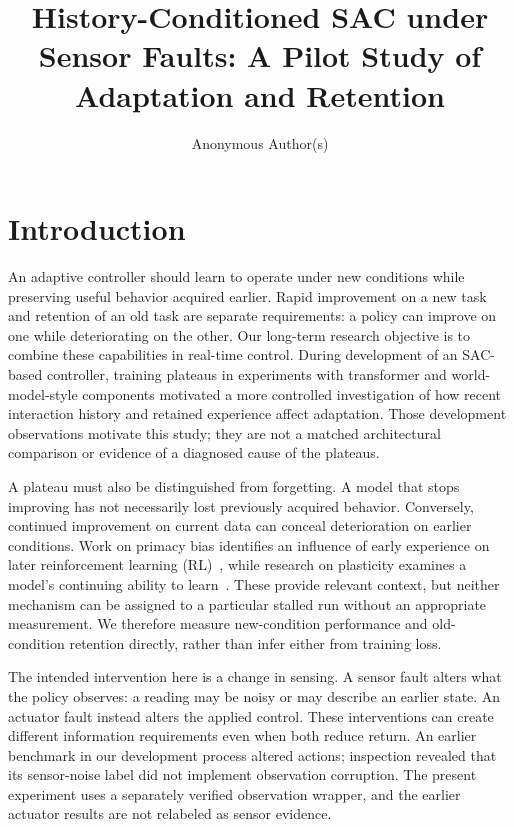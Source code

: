 \documentclass[runningheads]{llncs}
\begin{document}
\title{History-Conditioned SAC under Sensor Faults: A Pilot Study of Adaptation and Retention}
\author{Anonymous Author(s)}
\institute{}
\maketitle

\begin{abstract}

\end{abstract}

\section{Introduction}
An adaptive controller should learn to operate under new conditions while preserving useful behavior acquired earlier. Rapid improvement on a new task and retention of an old task are separate requirements: a policy can improve on one while deteriorating on the other. Our long-term research objective is to combine these capabilities in real-time control. During development of an SAC-based controller, training plateaus in experiments with transformer and world-model-style components motivated a more controlled investigation of how recent interaction history and retained experience affect adaptation. Those development observations motivate this study; they are not a matched architectural comparison or evidence of a diagnosed cause of the plateaus.

A plateau must also be distinguished from forgetting. A model that stops improving has not necessarily lost previously acquired behavior. Conversely, continued improvement on current data can conceal deterioration on earlier conditions. Work on primacy bias identifies an influence of early experience on later reinforcement learning (RL)~\cite{primacy}, while research on plasticity examines a model's continuing ability to learn~\cite{plasticity}. These provide relevant context, but neither mechanism can be assigned to a particular stalled run without an appropriate measurement. We therefore measure new-condition performance and old-condition retention directly, rather than infer either from training loss.

The intended intervention here is a change in sensing. A sensor fault alters what the policy observes: a reading may be noisy or may describe an earlier state. An actuator fault instead alters the applied control. These interventions can create different information requirements even when both reduce return. An earlier benchmark in our development process altered actions; inspection revealed that its sensor-noise label did not implement observation corruption. The present experiment uses a separately verified observation wrapper, and the earlier actuator results are not relabeled as sensor evidence.
\end{document}
